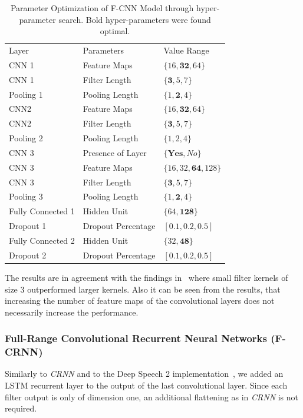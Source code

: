 \begin{table}
  \caption{Parameter Optimization of F-CNN Model through hyper-parameter search. Bold hyper-parameters were found optimal.}%
  \label{tab:fcnnhyper}
  \centering
\begin{tabular}{lll}
  \toprule
  Layer               & Parameters        & Value Range \\
  CNN 1               & Feature Maps      & \( \{16, \mathbf{32}, 64\} \) \\
  CNN 1               & Filter Length     & \( \{\mathbf{3}, 5, 7\} \) \\
  Pooling 1           & Pooling Length    & \( \{1, \mathbf{2}, 4\} \) \\
  CNN2                & Feature Maps      & \( \{16, \mathbf{32}, 64\} \) \\
  CNN2                & Filter Length     & \( \{\mathbf{3}, 5, 7\} \) \\
  Pooling 2           & Pooling Length    & \( \{1, 2, 4\} \) \\
  \midrule
  CNN 3               & Presence of Layer & \( \{\mathbf{Yes}, No\} \) \\
  CNN 3               & Feature Maps      & \( \{16, 32, \mathbf{64}, 128\} \) \\
  CNN 3               & Filter Length     & \( \{\mathbf{3}, 5, 7\} \) \\
  Pooling 3           & Pooling Length    & \( \{1, \mathbf{2}, 4\} \) \\
  \midrule
  Fully Connected 1   & Hidden Unit       & \( \{64, \mathbf{128}\} \) \\
  Dropout 1           & Dropout Percentage& \( [0.1, \mathbf{0.2}, 0.5] \) \\
  Fully Connected 2   & Hidden Unit       & \( \{32, \mathbf{48}\} \) \\
  Dropout 2           & Dropout Percentage& \( [0.1, \mathbf{0.2}, 0.5] \) \\
  \bottomrule
  \end{tabular}
\end{table}

The results are in agreement with the findings in~\cite{schluter16} where small filter kernels of size 3 outperformed larger kernels. Also it can be seen from the results, that increasing the number of feature maps of the convolutional layers does not necessarily increase the performance.

\subsubsection{Full-Range Convolutional Recurrent Neural Networks (F-CRNN)}%
Similarly to \emph{CRNN} and to the Deep Speech 2 implementation~\cite{amodei16}, we added an LSTM recurrent layer to the output of the last convolutional layer.
Since each filter output is only of dimension one, an additional flattening as in \emph{CRNN} is not required.

